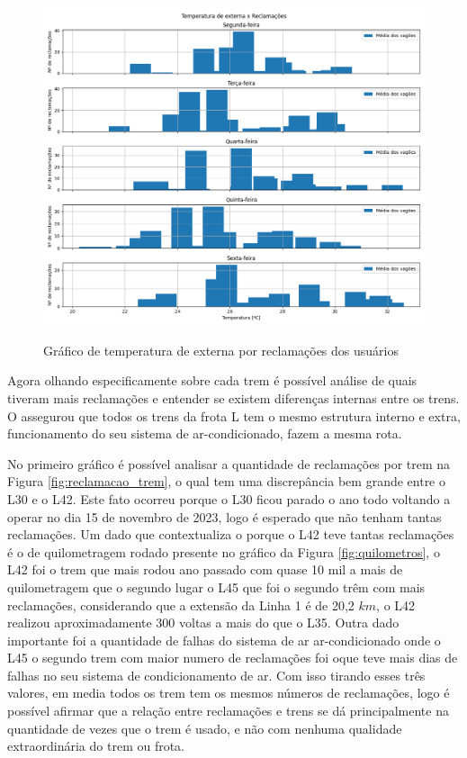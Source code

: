 \documentclass[acronym,symbols,table]{fei}
\begin{document}
\begin{figure}[!htb]
    \centering
    \caption{Gráfico de temperatura de externa por reclamações dos usuários}
    \includegraphics[width=0.7\linewidth]{Imagens/Temperatura_de_externa_x_Reclamacoes.png}
    \label{fig:externa_reclamacoes}
\end{figure}

Agora olhando especificamente sobre cada trem é possível análise de quais tiveram mais reclamações e entender se existem diferenças internas entre os trens. O \textcite{metrosp2024} assegurou que todos os trens da frota L tem o mesmo estrutura interno e extra, funcionamento do seu sistema de ar-condicionado, fazem a mesma rota. 

No primeiro gráfico é possível analisar a quantidade de reclamações por trem na Figura \ref{fig:reclamacao_trem}, o qual tem uma discrepância bem grande entre o L30 e o L42. Este fato ocorreu porque o L30 ficou parado o ano todo voltando a operar no dia 15 de novembro de 2023, logo é esperado que não tenham tantas reclamações. Um dado que contextualiza o porque o L42 teve tantas reclamações é o de quilometragem rodado presente no gráfico da Figura \ref{fig:quilometros}, o L42 foi o trem que mais rodou ano passado com quase 10 mil a mais de quilometragem que o segundo lugar o L45 que foi o segundo trêm com mais reclamações, considerando que a extensão da Linha 1 é de 20,2 $km$, o L42 realizou aproximadamente 300 voltas a mais do que o L35. Outra dado importante foi a quantidade de falhas do sistema de ar ar-condicionado onde o L45 o segundo trem com maior numero de reclamações foi oque teve mais dias de falhas no seu sistema de condicionamento de ar. Com isso tirando esses três valores, em media todos os trem tem os mesmos números de reclamações, logo é possível afirmar que a relação entre reclamações e trens se dá principalmente na quantidade de vezes que o trem é usado, e não com nenhuma qualidade extraordinária do trem ou frota.
\end{document}

